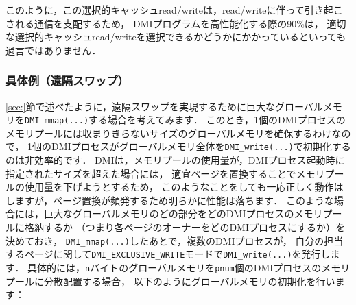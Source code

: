 \documentclass[report,12pt]{jsbook}
\begin{document}
このように，この選択的キャッシュread/writeは，read/writeに伴って引き起こされる通信を支配するため，
DMIプログラムを高性能化する際の90\%は，
適切な選択的キャッシュread/writeを選択できるかどうかにかかっているといっても過言ではありません．

\subsubsection{具体例（遠隔スワップ）}

\ref{sec:}節で述べたように，遠隔スワップを実現するために巨大なグローバルメモリを\texttt{DMI\_mmap(...)}する場合を考えてみます．
このとき，1個のDMIプロセスのメモリプールには収まりきらないサイズのグローバルメモリを確保するわけなので，
1個のDMIプロセスがグローバルメモリ全体を\texttt{DMI\_write(...)}で初期化するのは非効率的です．
DMIは，メモリプールの使用量が，DMIプロセス起動時に指定されたサイズを超えた場合には，
適宜ページを置換することでメモリプールの使用量を下げようとするため，
このようなことをしても一応正しく動作はしますが，ページ置換が頻発するため明らかに性能は落ちます．
このような場合には，巨大なグローバルメモリのどの部分をどのDMIプロセスのメモリプールに格納するか
（つまり各ページのオーナーをどのDMIプロセスにするか）を決めておき，
\texttt{DMI\_mmap(...)}したあとで，複数のDMIプロセスが，
自分の担当するページに関して\texttt{DMI\_EXCLUSIVE\_WRITE}モードで\texttt{DMI\_write(...)}を発行します．
具体的には，\texttt{n}バイトのグローバルメモリを\texttt{pnum}個のDMIプロセスのメモリプールに分散配置する場合，
以下のようにグローバルメモリの初期化を行います：
\end{document}
